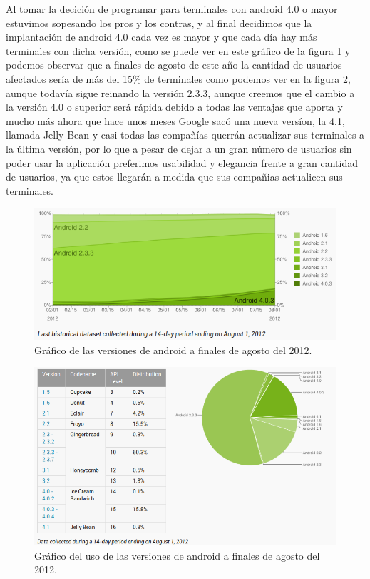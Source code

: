 Al tomar la decición de programar para terminales con android 4.0 o mayor estuvimos sopesando los pros y los contras, y al final decidimos que la implantación de android 4.0 cada vez es mayor y que cada día hay más terminales con dicha versión, como se puede ver en este gráfico de la figura \ref{fig:graficoEvolucionAndroid} y podemos observar que a finales de agosto de este año la cantidad de usuarios afectados sería de más del 15\% de terminales como podemos ver en la figura \ref{fig:graficoUsoAndroid}, aunque todavía sigue reinando la versión 2.3.3, aunque creemos que el cambio a la versión 4.0 o superior será rápida debido a todas las ventajas que aporta y mucho más ahora que hace unos meses Google sacó una nueva versíon, la 4.1, llamada Jelly Bean y casi todas las compañías querrán actualizar sus terminales a la última versión, por lo que a pesar de dejar a un gran número de usuarios sin poder usar la aplicación preferimos usabilidad y elegancia frente a gran cantidad de usuarios, ya que estos llegarán a medida que sus compañias actualicen sus terminales.

\begin{figure}
  \centering
    \includegraphics[scale=0.8]{./Introduccion/imagenes/graficoEvolucionAndroid.png}
  \caption{Gráfico de las versiones de android a finales de agosto del 2012.}
  \label{fig:graficoEvolucionAndroid}
\end{figure}

\begin{figure}
  \centering
    \includegraphics[scale=0.5]{./Introduccion/imagenes/graficoUsoAndroid.png}
  \caption{Gráfico del uso de las versiones de android a finales de agosto del 2012.}
  \label{fig:graficoUsoAndroid}
\end{figure}


